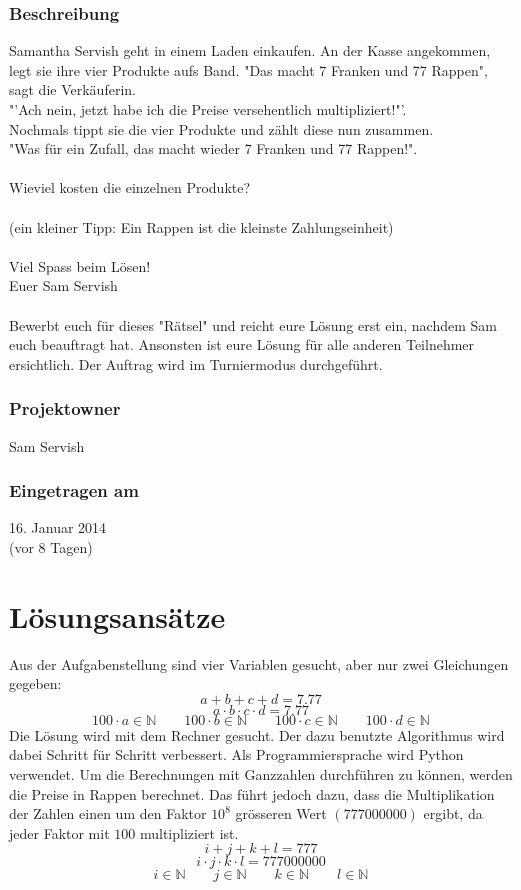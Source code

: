 \documentclass[10pt, fleqn]{article}
\begin{document}
\subsubsection*{Beschreibung}
Samantha Servish geht in einem Laden einkaufen. An der Kasse angekommen, legt 
sie ihre vier Produkte aufs Band. "Das macht 7 Franken und 77 Rappen", sagt 
die Verkäuferin. \\
"'Ach nein, jetzt habe ich die Preise versehentlich multipliziert!"'. \\
Nochmals tippt sie die vier Produkte und zählt diese nun zusammen. \\
"Was für ein Zufall, das macht wieder 7 Franken und 77 Rappen!". \\\\
%
Wieviel kosten die einzelnen Produkte? \\\\
%
(ein kleiner Tipp: Ein Rappen ist die kleinste Zahlungseinheit) \\\\
%
Viel Spass beim Lösen! \\
Euer Sam Servish \\\\
%
Bewerbt euch für dieses "Rätsel" und reicht eure Lösung erst ein, nachdem Sam 
euch beauftragt hat. Ansonsten ist eure Lösung für alle anderen Teilnehmer 
ersichtlich. Der Auftrag wird im Turniermodus durchgeführt. 

\subsubsection*{Projektowner}
Sam Servish 

\subsubsection*{Eingetragen am}
16. Januar 2014 \\
(vor 8 Tagen) 

\newpage

\section{Lösungsansätze}
Aus der Aufgabenstellung sind vier Variablen gesucht, aber nur zwei Gleichungen 
gegeben: 
\[ a + b + c + d = 7.77 \]
\[ a \cdot b \cdot c \cdot d = 7.77 \]
\[ 100 \cdot a \in \mathbb{N} \qquad 100 \cdot b \in \mathbb{N} \qquad 
100 \cdot c \in \mathbb{N} \qquad 100 \cdot d \in \mathbb{N} \]
Die Lösung wird mit dem Rechner gesucht. Der dazu benutzte Algorithmus wird 
dabei Schritt für Schritt verbessert. Als Programmiersprache wird Python 
verwendet. Um die Berechnungen mit Ganzzahlen durchführen zu können, werden 
die Preise in Rappen berechnet. Das führt jedoch dazu, dass die Multiplikation 
der Zahlen einen um den Faktor $10^8$ grösseren Wert $(777000000)$ ergibt, da 
jeder Faktor mit $100$ multipliziert ist. 
\[ i + j + k + l = 777 \]
\[ i \cdot j \cdot k \cdot l = 777000000 \]
\[ i \in \mathbb{N} \qquad j \in \mathbb{N} \qquad 
k \in \mathbb{N} \qquad l \in \mathbb{N} \]
\end{document}
